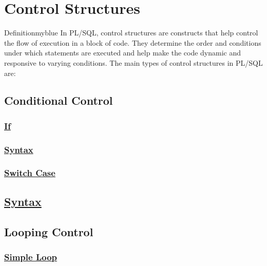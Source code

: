 \vspace{0.5cm}
\section{Control Structures}

\begin{prettyBox}{Definition}{myblue}
In PL/SQL, control structures are constructs that help control the flow of execution in a block of code.
They determine the order and conditions under which statements are executed and help make the code dynamic
and responsive to varying conditions. The main types of control structures in PL/SQL are:
\end{prettyBox}

\vspace{0.25cm}

\subsection{Conditional Control}
\newpage
\subsubsection{\underline{If}} 
\subsubsection{\underline{Syntax}}




\vspace{0.25cm}

\subsubsection{\underline{Switch Case}}

\subsection*{\underline{Syntax}}



\vspace{0.25cm}

\subsection{Looping Control}

\subsubsection{\underline{Simple Loop}}



